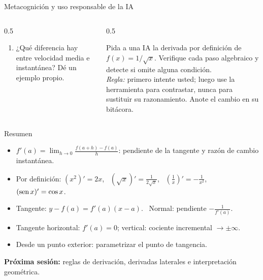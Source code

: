 \documentclass[10pt,aspectratio=169]{beamer}
\begin{document}
\begin{frame}{Metacognición y uso responsable de la IA}
  \small
  \begin{columns}[t]
    \begin{column}{0.5\textwidth}
      \begin{metacog}
        \begin{enumerate}
          \metacomun
          \item ¿Qué diferencia hay entre velocidad media e instantánea? Dé un ejemplo propio.
        \end{enumerate}
      \end{metacog}
    \end{column}
    \begin{column}{0.5\textwidth}
      \begin{iabox}
        Pida a una IA la derivada por definición de $f(x)=1/\sqrt x$. Verifique cada paso algebraico y detecte si omite alguna condición.\\[2pt]
        \textit{Regla:} primero intente usted; luego use la herramienta para contrastar, nunca para sustituir su razonamiento. Anote el cambio en su bitácora.
      \end{iabox}
    \end{column}
  \end{columns}
\end{frame}

\begin{frame}{Resumen}
  \begin{itemize}
    \item $f'(a)=\lim_{h\to0}\frac{f(a+h)-f(a)}{h}$: pendiente de la tangente y razón de cambio instantánea.
    \item Por definición: $(x^2)'=2x$, \ $(\sqrt x)'=\frac1{2\sqrt x}$, \ $(\frac1x)'=-\frac1{x^2}$, \ $(\operatorname{sen} x)'=\cos x$.
    \item Tangente: $y-f(a)=f'(a)(x-a)$. \ Normal: pendiente $-\frac1{f'(a)}$.
    \item Tangente horizontal: $f'(a)=0$; vertical: cociente incremental $\to\pm\infty$.
    \item Desde un punto exterior: parametrizar el punto de tangencia.
  \end{itemize}
  \vspace{3mm}
  \textbf{Próxima sesión:} reglas de derivación, derivadas laterales e interpretación geométrica.
\end{frame}
\end{document}
